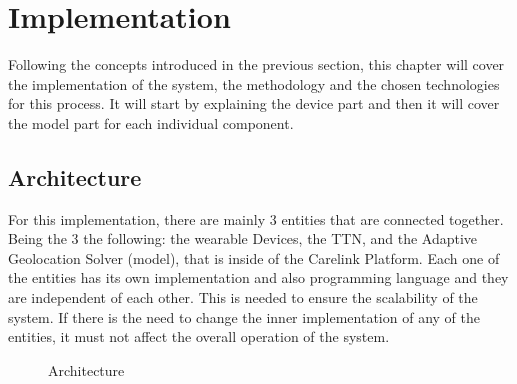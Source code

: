 


\chapter{Implementation}
\label{cha:Implementation}

Following the concepts introduced in the previous section, this chapter will cover the implementation of the system, the methodology and the chosen technologies for this process.  It will start by explaining the device part and then it will cover the model part for each individual component.


\section{Architecture}
\label{sec:Architecture}

For this implementation, there are mainly 3  entities that are connected together. Being the 3 the following: the wearable Devices, the TTN, and the Adaptive Geolocation Solver (model), that is inside of the Carelink Platform.
Each one of the entities has its own implementation and also programming language and they are independent of each other.
This is needed to ensure the scalability of the system.
If there is the need to change the inner implementation of any of the entities, it must not affect the overall operation of the system.

\begin{figure}[htbp]
  \centering
 
  \caption{Architecture}
  \label{fig:Arch}
\end{figure}


